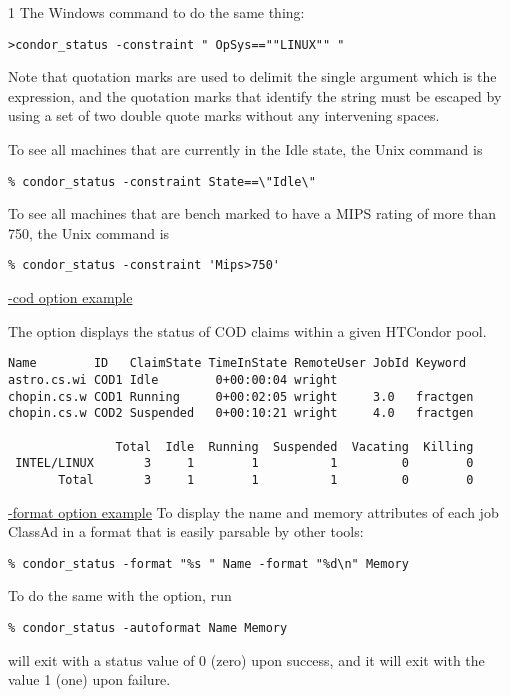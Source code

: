\begin{ManPage}{\label{man-condor-status}}{1}
The Windows command to do the same thing:
\begin{verbatim}
>condor_status -constraint " OpSys==""LINUX"" "
\end{verbatim}
Note that quotation marks are used to delimit the single argument which
is the expression, and the quotation marks that identify the string
must be escaped by using a set of two double quote marks without
any intervening spaces.

To see all machines that are currently in the Idle state,
the Unix command is
\begin{verbatim}
% condor_status -constraint State==\"Idle\"
\end{verbatim}

To see all machines that are bench marked to have a MIPS rating
of more than 750, the Unix command is
\begin{verbatim}
% condor_status -constraint 'Mips>750' 
\end{verbatim}

\underline{-cod option example}

The  option displays the status of COD
claims within a given HTCondor pool. 

\footnotesize
\begin{verbatim}
Name        ID   ClaimState TimeInState RemoteUser JobId Keyword
astro.cs.wi COD1 Idle        0+00:00:04 wright
chopin.cs.w COD1 Running     0+00:02:05 wright     3.0   fractgen
chopin.cs.w COD2 Suspended   0+00:10:21 wright     4.0   fractgen

               Total  Idle  Running  Suspended  Vacating  Killing
 INTEL/LINUX       3     1        1          1         0        0
       Total       3     1        1          1         0        0
\end{verbatim}
\normalsize

\underline{-format option example}
To display the name and memory attributes of each job ClassAd in a format
that is easily parsable by other tools:
\begin{verbatim}
% condor_status -format "%s " Name -format "%d\n" Memory
\end{verbatim}
To do the same with the  option, run
\begin{verbatim}
% condor_status -autoformat Name Memory
\end{verbatim}


\ExitStatus

 will exit with a status value of 0 (zero) upon success,
and it will exit with the value 1 (one) upon failure.

\end{ManPage}

